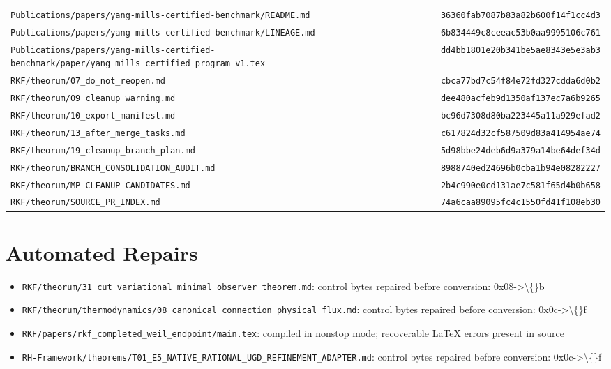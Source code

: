 \documentclass[11pt,openany]{book}
\begin{document}
\begin{small}
\begin{longtable}{p{}p{}}
\texttt{Publications/papers/yang-mills-certified-benchmark/README.md} & \texttt{36360fab7087b83a82b600f14f1cc4d3}\\
\texttt{Publications/papers/yang-mills-certified-benchmark/LINEAGE.md} & \texttt{6b834449c8ceeac53b0aa9995106c761}\\
\texttt{Publications/papers/yang-mills-certified-benchmark/paper/yang\_mills\_certified\_program\_v1.tex} & \texttt{dd4bb1801e20b341be5ae8343e5e3ab3}\\
\texttt{RKF/theorum/07\_do\_not\_reopen.md} & \texttt{cbca77bd7c54f84e72fd327cdda6d0b2}\\
\texttt{RKF/theorum/09\_cleanup\_warning.md} & \texttt{dee480acfeb9d1350af137ec7a6b9265}\\
\texttt{RKF/theorum/10\_export\_manifest.md} & \texttt{bc96d7308d80ba223445a11a929efad2}\\
\texttt{RKF/theorum/13\_after\_merge\_tasks.md} & \texttt{c617824d32cf587509d83a414954ae74}\\
\texttt{RKF/theorum/19\_cleanup\_branch\_plan.md} & \texttt{5d98bbe24deb6d9a379a14be64def34d}\\
\texttt{RKF/theorum/BRANCH\_CONSOLIDATION\_AUDIT.md} & \texttt{8988740ed24696b0cba1b94e08282227}\\
\texttt{RKF/theorum/MP\_CLEANUP\_CANDIDATES.md} & \texttt{2b4c990e0cd131ae7c581f65d4b0b658}\\
\texttt{RKF/theorum/SOURCE\_PR\_INDEX.md} & \texttt{74a6caa89095fc4c1550fd41f108eb30}\\
\end{longtable}\end{small}
\chapter{Automated Repairs}
\begin{itemize}
\item \texttt{RKF/theorum/31\_cut\_variational\_minimal\_observer\_theorem.md}: control bytes repaired before conversion: 0x08->\textbackslash\{\}b
\item \texttt{RKF/theorum/thermodynamics/08\_canonical\_connection\_physical\_flux.md}: control bytes repaired before conversion: 0x0c->\textbackslash\{\}f
\item \texttt{RKF/papers/rkf\_completed\_weil\_endpoint/main.tex}: compiled in nonstop mode; recoverable LaTeX errors present in source
\item \texttt{RH-Framework/theorems/T01\_E5\_NATIVE\_RATIONAL\_UGD\_REFINEMENT\_ADAPTER.md}: control bytes repaired before conversion: 0x0c->\textbackslash\{\}f
\end{itemize}
\end{document}
